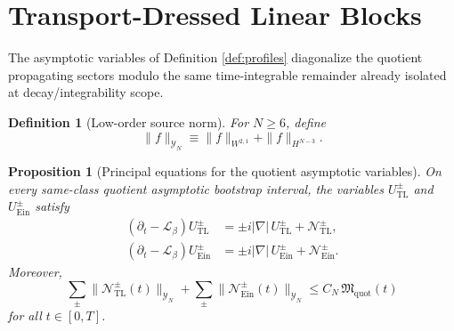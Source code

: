 \documentclass[11pt]{article}
\newcommand{\Ell}{\mathcal{L}}
\newtheorem{definition}{Definition}
\newtheorem{proposition}{Proposition}
\begin{document}
\section{Transport-Dressed Linear Blocks}

The asymptotic variables of Definition \ref{def:profiles} diagonalize the quotient propagating sectors modulo the same time-integrable remainder already isolated at decay/integrability scope.

\begin{definition}[Low-order source norm]
\label{def:Ynorm}
For \(N\ge 6\), define
\begin{equation}
\|f\|_{\mathcal Y_N}
\equiv
\|f\|_{W^{2,1}}+\|f\|_{H^{N-3}}.
\label{eq:Ynorm}
\end{equation}
\end{definition}

\begin{proposition}[Principal equations for the quotient asymptotic variables]
\label{prop:principal}
On every same-class quotient asymptotic bootstrap interval, the variables \(U_{\mathrm{TL}}^\pm\) and \(U_{\mathrm{Ein}}^\pm\) satisfy
\begin{align}
(\partial_t-\Ell_\beta)U_{\mathrm{TL}}^\pm
&=
\pm i|\nabla|\,U_{\mathrm{TL}}^\pm
+\mathcal N_{\mathrm{TL}}^\pm,
\label{eq:UTLeq}
\\
(\partial_t-\Ell_\beta)U_{\mathrm{Ein}}^\pm
&=
\pm i|\nabla|\,U_{\mathrm{Ein}}^\pm
+\mathcal N_{\mathrm{Ein}}^\pm.
\label{eq:UEineq}
\end{align}
Moreover,
\begin{equation}
\sum_{\pm}\|\mathcal N_{\mathrm{TL}}^\pm(t)\|_{\mathcal Y_N}
+\sum_{\pm}\|\mathcal N_{\mathrm{Ein}}^\pm(t)\|_{\mathcal Y_N}
\le
C_N\,\mathfrak M_{\mathrm{quot}}(t)
\label{eq:Nbound}
\end{equation}
for all \(t\in[0,T]\).
\end{proposition}
\end{document}
